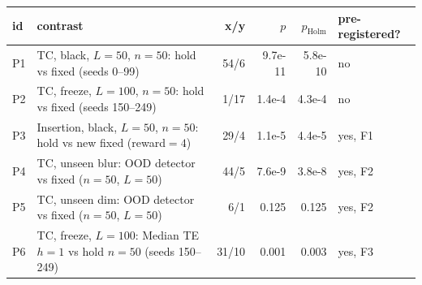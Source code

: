 \begin{tabular}{lp{6.4cm}rrrp{3.2cm}}
\toprule
id & contrast & x/y & $p$ & $p_{\mathrm{Holm}}$ & pre-registered? \\
\midrule
P1 & TC, black, $L{=}50$, $n{=}50$: hold vs fixed (seeds 0--99) & 54/6 & 9.7e-11 & 5.8e-10 & no \\
P2 & TC, freeze, $L{=}100$, $n{=}50$: hold vs fixed (seeds 150--249) & 1/17 & 1.4e-4 & 4.3e-4 & no \\
P3 & Insertion, black, $L{=}50$, $n{=}50$: hold vs new fixed (reward${=}4$) & 29/4 & 1.1e-5 & 4.4e-5 & yes, F1 \\
P4 & TC, unseen blur: OOD detector vs fixed ($n{=}50$, $L{=}50$) & 44/5 & 7.6e-9 & 3.8e-8 & yes, F2 \\
P5 & TC, unseen dim: OOD detector vs fixed ($n{=}50$, $L{=}50$) & 6/1 & 0.125 & 0.125 & yes, F2 \\
P6 & TC, freeze, $L{=}100$: Median TE $h{=}1$ vs hold $n{=}50$ (seeds 150--249) & 31/10 & 0.001 & 0.003 & yes, F3 \\
\bottomrule
\end{tabular}
